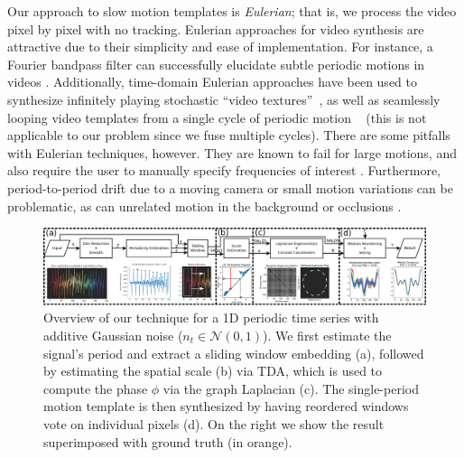 \documentclass{article}
\begin{document}
Our approach to slow motion templates is {\em Eulerian}; that is, we process the video pixel by pixel with no tracking.  Eulerian approaches for video synthesis are attractive due to their simplicity and ease of implementation.  For instance, a Fourier bandpass filter can successfully elucidate subtle periodic motions in videos \cite{wu2012eulerian, wadhwa2013phase}.  Additionally, time-domain Eulerian approaches have been used to synthesize infinitely playing stochastic ``video textures''~\cite{schodl2000video}, as well as seamlessly looping video templates from a single cycle of periodic motion ~\cite{Liao2013VideoLoops,Liao2015VideoLoops} (this is not applicable to our problem since we fuse multiple cycles).  There are some pitfalls with Eulerian techniques, however.  They are known to fail for large motions, and also require the user to manually specify frequencies of interest \cite{wu2012eulerian, wadhwa2013phase}.  Furthermore, period-to-period drift due to a moving camera or small motion variations can be problematic, as can unrelated motion in the background or occlusions \cite{stauffer1999adaptive}.

\begin{figure}
\centering
\includegraphics[width=\textwidth]{BlockDiagram.pdf}
	\caption{Overview of our technique for a 1D periodic time series with additive Gaussian noise ($n_t \in \mathcal{N}(0, 1)$). We first estimate the signal's period and extract a sliding window embedding (a), followed by estimating the spatial scale (b) via TDA, which is used to compute the phase $\phi$ via the graph Laplacian (c). The single-period motion template is then synthesized by having reordered windows vote on individual pixels (d). On the right we show the result superimposed with ground truth (in orange).}
\label{fig:ConceptFigure}
\end{figure}
\end{document}

